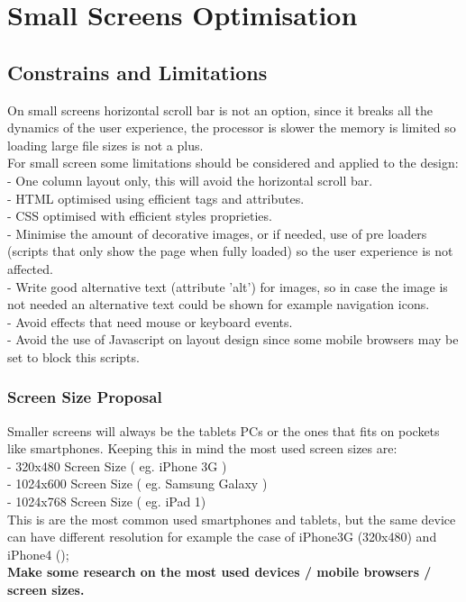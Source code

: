 

\section{Small Screens Optimisation}

\subsection{Constrains and Limitations}
On small screens horizontal scroll bar is not an option, since it breaks all the dynamics of the user experience, the processor is slower the memory is limited so loading large file sizes is not a plus.\\
For small screen some limitations should be considered and applied to the design:\\
- One column layout only, this will avoid the horizontal scroll bar.\\
- HTML optimised using efficient tags and attributes.\\
- CSS optimised with efficient styles proprieties.\\
- Minimise the amount of decorative images, or if needed, use of pre loaders (scripts that only show the page when fully loaded) so the user experience is not affected.\\
- Write good alternative text (attribute 'alt')  for images, so in case the image is not needed an alternative text could be shown for example navigation icons.\\
- Avoid effects that need mouse or keyboard events.\\
- Avoid the use of Javascript on layout design since some mobile browsers may be set to block this scripts.

\subsubsection{Screen Size Proposal}
Smaller screens will always be the tablets PCs or the ones that fits on pockets like smartphones. Keeping this in mind the most used screen sizes are:\\
- 320x480 Screen Size ( eg. iPhone 3G )\\
- 1024x600 Screen Size ( eg. Samsung Galaxy )\\
- 1024x768 Screen Size ( eg. iPad 1)\\
This is are the most common used smartphones and tablets, but the same device can have different resolution for example the case of iPhone3G (320x480) and iPhone4 ();
\\
\textbf{Make some research on the most used devices / mobile browsers / screen sizes.}
\\


